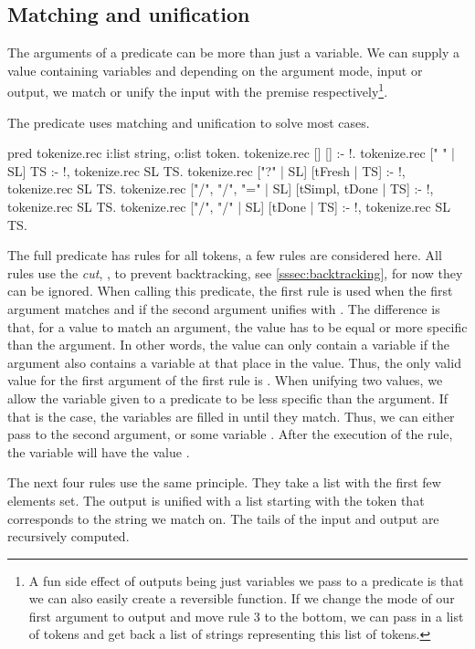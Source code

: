 \documentclass[thesis.tex]{subfiles}
\begin{document}
{{\subsection{Matching and unification}\label{sssec:mandu}
The arguments of a predicate can be more than just a variable. We can supply a value containing variables and depending on the argument mode, input or output, we match or unify the input with the premise respectively\footnote{A fun side effect of outputs being just variables we pass to a predicate is that we can also easily create a reversible function. If we change the mode of our first argument to output and move rule 3 to the bottom, we can pass in a list of tokens and get back a list of strings representing this list of tokens.}.

The predicate  uses matching and unification to solve most cases.
\begin{elpicode}
  pred tokenize.rec i:list string, o:list token.
  tokenize.rec [] [] :- !.
  tokenize.rec [" " | SL] TS :- !, tokenize.rec SL TS.
  tokenize.rec ["?" | SL] [tFresh | TS] :- !, 
    tokenize.rec SL TS.
  tokenize.rec ["/", "/", "=" | SL] 
               [tSimpl, tDone | TS] :- !, 
    tokenize.rec SL TS.
  tokenize.rec ["/", "/" | SL] [tDone | TS] :- !, 
    tokenize.rec SL TS.
\end{elpicode}
The full predicate has rules for all tokens, a few rules are considered here. All rules  use the \emph{cut}, \elpii{!}, to prevent backtracking, see \cref{sssec:backtracking}, for now they can be ignored. When calling this predicate, the first rule is used when the first argument matches \elpii{[]} and if the second argument unifies with \elpii{[]}. The difference is that, for a value to match an argument, the value has to be equal or more specific than the argument. In other words, the value can only contain a variable if the argument also contains a variable at that place in the value. Thus, the only valid value for the first argument of the first rule is \elpii{[]}. When unifying two values, we allow the variable given to a predicate to be less specific than the argument. If that is the case, the variables are filled in until they match. Thus, we can either pass \elpii{[]} to the second argument, or some variable . After the execution of the rule, the variable  will have the value \elpii{[]}.

The next four rules use the same principle. They take a list with the first few elements set. The output is unified with a list starting with the token that corresponds to the string we match on. The tails of the input and output are recursively computed.

}}
\end{document}
